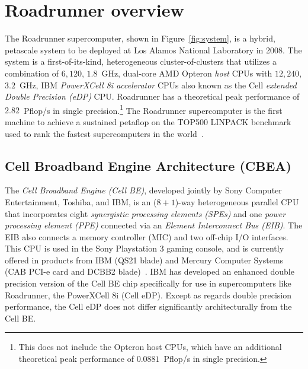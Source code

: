 \documentclass[journal,twoside]{IEEEtran}
\newcommand{\fig}[1]{Figure~\ref{fig:#1}}
\begin{document}
\section{Roadrunner overview}

The Roadrunner supercomputer, shown in \fig{system}, is a hybrid,
petascale system to be deployed at Los Alamos National Laboratory in
2008.  The system is a first-of-its-kind, heterogeneous
cluster-of-clusters that utilizes a combination of $6,120$, $1.8$~GHz,
dual-core AMD Opteron \emph{host} CPUs with $12,240$, $3.2$~GHz, IBM
\emph{PowerXCell 8i accelerator} CPUs also known as the Cell
\emph{extended Double Precision (eDP)} CPU.  Roadrunner has a
theoretical peak performance of $2.82$~Pflop/s in single
precision.\footnote{This does not include the Opteron host CPUs, which
have an additional theoretical peak performance of $0.0881$~Pflop/s in
single precision.}  The Roadrunner supercomputer is the first machine
to achieve a sustained petaflop on the TOP500 LINPACK benchmark used
to rank the fastest supercomputers in the world~\cite{top500}.

\subsection{Cell Broadband Engine Architecture (CBEA)}


The \emph{Cell Broadband Engine (Cell BE)}, developed jointly by Sony
Computer Entertainment, Toshiba, and IBM, is an ($8+1$)-way
heterogeneous parallel CPU that incorporates eight
\emph{synergistic processing elements (SPEs)} and one
\emph{power processing element (PPE)} connected via an
\emph{Element Interconnect Bus (EIB)}.  The EIB also connects
a memory controller (MIC) and two off-chip I/O interfaces.  This CPU
is used in the Sony Playstation 3 gaming console, and is currently
offered in products from IBM (QS21 blade) and Mercury Computer Systems
(CAB PCI-e card and DCBB2 blade)~\cite{mercury}.  IBM has developed an
enhanced double precision version of the Cell BE chip specifically for
use in supercomputers like Roadrunner, the PowerXCell 8i (Cell eDP).
Except as regards double precision performance, the Cell eDP does not
differ significantly architecturally from the Cell BE.
\end{document}
